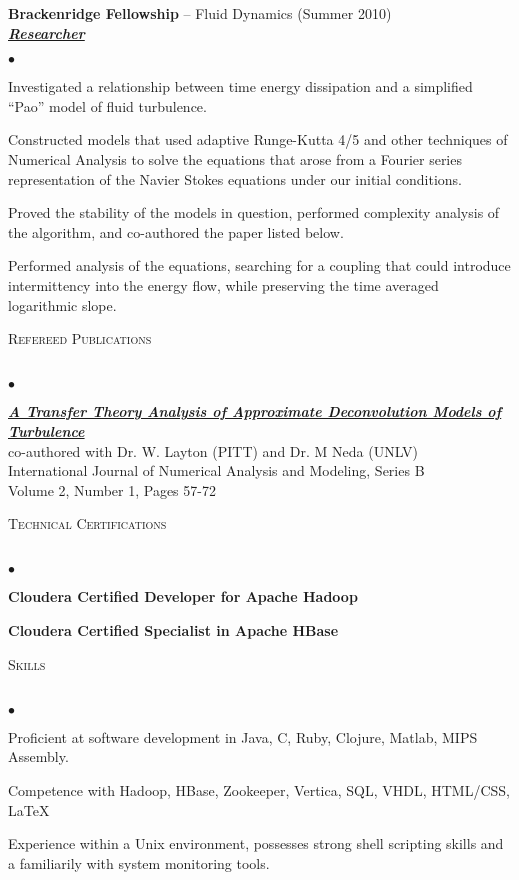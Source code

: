 \documentclass{article}
\newcommand{\lineunder}{\vspace*{-8pt} \\ \hspace*{-18pt} \hrulefill \\}
\newcommand{\header}[1]{{\hspace*{-15pt}\vspace*{6pt} \textsc{#1}} \vspace*{-6pt} \lineunder}
\newcommand{\employer}[4]{{ \textbf{#1} -- #2 (#3)\\ \underline{\textbf{\emph{#4}}}\\  }}
\newenvironment{achievements}{\begin{list}{$\bullet$}{\topsep 0pt \itemsep -2pt}}{\vspace*{4pt}\end{list}}
\begin{document}
\employer{Brackenridge Fellowship}{Fluid Dynamics}{Summer 2010}{Researcher}
\begin{achievements}
  \item Investigated a relationship between time energy dissipation and a simplified ``Pao'' model of fluid turbulence.
    \item Constructed models that used adaptive Runge-Kutta 4/5 and other techniques of Numerical Analysis to solve the equations that arose from a Fourier series representation of the Navier Stokes equations under our initial conditions.
      \item Proved the stability of the models in question, performed complexity analysis of the algorithm, and co-authored the paper listed below.
        \item Performed analysis of the equations, searching for a coupling that could introduce intermittency into the energy flow, while preserving the time averaged logarithmic slope.
\end{achievements}%
\newpage
\header{Refereed Publications}
\begin{achievements}
\item \emph{\textbf{\href{http://www.math.ualberta.ca/ijnamb/Volume-2-2011/No-1-11/2011-01-04.pdf}{A Transfer Theory Analysis of Approximate Deconvolution Models of Turbulence}
}}\\
  co-authored with Dr. W. Layton (PITT) and Dr. M Neda (UNLV)\\
  \footnotesize{International Journal of Numerical Analysis and Modeling, Series B}\\
  \footnotesize{Volume 2, Number 1, Pages 57-72}
\end{achievements}
\header{Technical Certifications}
\begin{achievements}
\item \textbf{Cloudera Certified Developer for Apache Hadoop} \\
\item \textbf{Cloudera Certified Specialist in Apache HBase} \\
\end{achievements}
\header{Skills}
\begin{achievements}
\item Proficient at software development in Java, C, Ruby, Clojure, Matlab, MIPS Assembly.
\item Competence with Hadoop, HBase, Zookeeper, Vertica, SQL, VHDL, HTML/CSS, \LaTeX
\item Experience within a Unix environment, possesses strong shell scripting skills and a familiarily with system monitoring tools.
\end{achievements}
\end{document}
